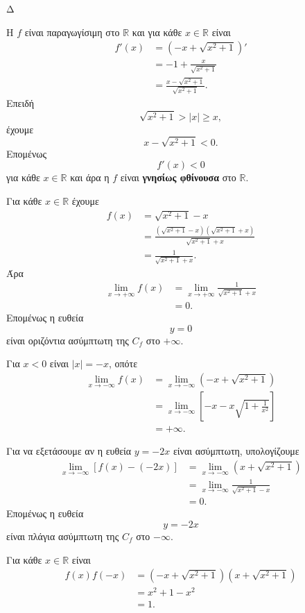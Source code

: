 \begin{thema}{Δ}
\begin{erwthma}
\item Η $f$ είναι παραγωγίσιμη στο $\mathbb{R}$ και για κάθε $x\in\mathbb{R}$ είναι
\begin{align*}
f'(x)
&=\left(-x+\sqrt{x^2+1}\right)'\\
&=-1+\frac{x}{\sqrt{x^2+1}}\\
&=\frac{x-\sqrt{x^2+1}}{\sqrt{x^2+1}}.
\end{align*}
Επειδή
\[
\sqrt{x^2+1}>|x|\geq x,
\]
έχουμε
\[
x-\sqrt{x^2+1}<0.
\]
Επομένως
\[
f'(x)<0
\]
για κάθε $x\in\mathbb{R}$ και άρα η $f$ είναι \textbf{γνησίως φθίνουσα} στο $\mathbb{R}$.

\item Για κάθε $x\in\mathbb{R}$ έχουμε
\begin{align*}
f(x)
&=\sqrt{x^2+1}-x\\
&=\frac{\left(\sqrt{x^2+1}-x\right)
\left(\sqrt{x^2+1}+x\right)}
{\sqrt{x^2+1}+x}\\
&=\frac{1}{\sqrt{x^2+1}+x}.
\end{align*}
Άρα
\begin{align*}
\lim_{x\to+\infty}f(x)
&=\lim_{x\to+\infty}
\frac{1}{\sqrt{x^2+1}+x}\\
&=0.
\end{align*}
Επομένως η ευθεία
\[
{y=0}
\]
είναι οριζόντια ασύμπτωτη της $C_f$ στο $+\infty$.

\item Για $x<0$ είναι $|x|=-x$, οπότε
\begin{align*}
\lim_{x\to-\infty}f(x)
&=\lim_{x\to-\infty}
\left(-x+\sqrt{x^2+1}\right)\\
&=\lim_{x\to-\infty}
\left[-x-x\sqrt{1+\frac{1}{x^2}}\right]\\
&=+\infty.
\end{align*}

Για να εξετάσουμε αν η ευθεία $y=-2x$ είναι ασύμπτωτη, υπολογίζουμε
\begin{align*}
\lim_{x\to-\infty}\left[f(x)-(-2x)\right]
&=\lim_{x\to-\infty}
\left(x+\sqrt{x^2+1}\right)\\
&=\lim_{x\to-\infty}
\frac{1}{\sqrt{x^2+1}-x}\\
&=0.
\end{align*}
Επομένως η ευθεία
\[
{y=-2x}
\]
είναι πλάγια ασύμπτωτη της $C_f$ στο $-\infty$.

\item Για κάθε $x\in\mathbb{R}$ είναι
\begin{align*}
f(x)f(-x)
&=\left(-x+\sqrt{x^2+1}\right)
\left(x+\sqrt{x^2+1}\right)\\
&=x^2+1-x^2\\
&=1.
\end{align*}


\end{erwthma}
\end{thema}
